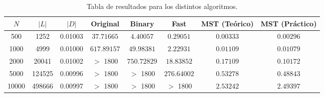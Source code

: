 \begin{table}[H]
\begin{tabular}{cccccccc}
\hline
    $N$ &    $|L|$ &  $|D|$ & Original             & Binary               & Fast                 & MST (Teórico)          & MST (Práctico)         \\
\hline
   500 & 1252 & 0.01003  &   $37.71665$ & $4.40057$  & $0.29051$ & $0.00333$  & $0.00296$ \\
   1000 & 4999 & 0.01000   &  $617.89157$  & $49.98381$ & $2.22931$  & $0.01109$ & $0.01079$ \\
  2000 & 20041 & 0.01002  &  \ensuremath{>} 1800               & $750.72829$  & $18.83852$ & $0.17109$  & $0.10172$  \\
 5000 & 124525 & 0.00996 &  \ensuremath{>} 1800               & \ensuremath{>} 1800               & $276.64002$ & $0.53278$   & $0.48843$   \\
 10000 & 498666 & 0.00997 & \ensuremath{>} 1800               & \ensuremath{>} 1800               & \ensuremath{>} 1800               & $2.53242$    & $2.49397$   \\
\hline
\end{tabular}
\caption{Tabla de resultados para los distintos algoritmos.}
\label{result}
\end{table}
